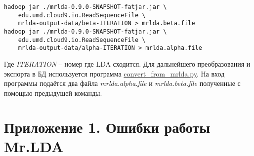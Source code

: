 \begin{verbatim}
hadoop jar ./mrlda-0.9.0-SNAPSHOT-fatjar.jar \
    edu.umd.cloud9.io.ReadSequenceFile \
    mrlda-output-data/beta-ITERATION > mrlda.beta.file
hadoop jar ./mrlda-0.9.0-SNAPSHOT-fatjar.jar \
    edu.umd.cloud9.io.ReadSequenceFile \
    mrlda-output-data/alpha-ITERATION > mrlda.alpha.file
\end{verbatim}

Где \emph{ITERATION} -- номер где LDA сходится. Для дальнейшего преобразования и экспорта в БД 
используется программа 
\href{https://github.com/SemPatent/Golubev/blob/master/convert_from_mrlda.py}{convert\_from\_mrlda.py}.
На вход программы подаётся два файла \emph{mrlda.alpha.file} и \emph{mrlda.beta.file} полученные с помощью 
предыдущей команды.

\chapter{Приложение 1. Ошибки работы Mr.LDA}
\label{app01}
\tiny

